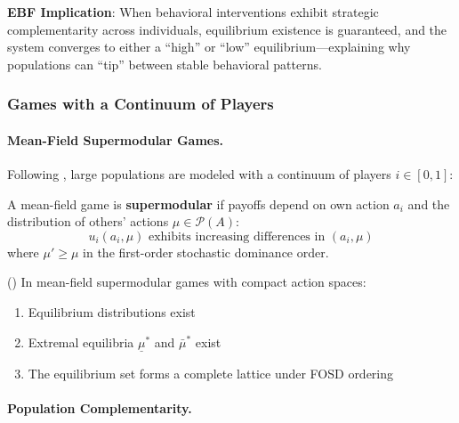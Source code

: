 \textbf{EBF Implication}: When behavioral interventions exhibit strategic 
complementarity across individuals, equilibrium existence is guaranteed, and the 
system converges to either a ``high'' or ``low'' equilibrium---explaining why 
populations can ``tip'' between stable behavioral patterns.

\subsubsection{Games with a Continuum of Players}

\paragraph{Mean-Field Supermodular Games.}

Following \citet{balbus2019supermodular}, large populations are modeled with a 
continuum of players $i \in [0,1]$:

\begin{definition}
\label{def:mean-field}
A mean-field game is \textbf{supermodular} if payoffs depend on own action $a_i$ 
and the distribution of others' actions $\mu \in \mathcal{P}(A)$:
\begin{equation}
u_i(a_i, \mu) \text{ exhibits increasing differences in } (a_i, \mu)
\end{equation}
where $\mu' \geq \mu$ in the first-order stochastic dominance order.
\end{definition}

\begin{theorem}
\label{thm:mean-field-eq}
\textup{(\citet{balbus2019supermodular})}
In mean-field supermodular games with compact action spaces:
\begin{enumerate}
    \item Equilibrium distributions exist
    \item Extremal equilibria $\underline{\mu}^*$ and $\bar{\mu}^*$ exist
    \item The equilibrium set forms a complete lattice under FOSD ordering
\end{enumerate}
\end{theorem}

\paragraph{Population Complementarity.}


